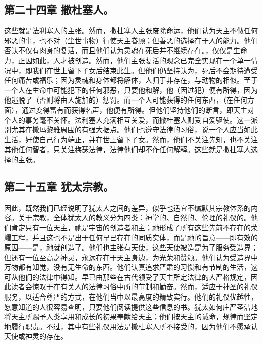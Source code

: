 
\subsection{第二十四章 撒杜塞人。}

这些就是法利塞人的主张。然而，撒杜塞人主张废除命运，他们认为天主不做任何邪恶的事，也不对（尘世事物）行使天主眷顾；但善恶的选择在于人的能力。他们否认不仅有肉身的复活，而且他们认为灵魂在死后并不继续存在。，仅仅是生命力，正因如此，人才被创造。然而，他们主张复活的观念已完全实现在一个单一情况中，即我们在世上留下子女后结束此生。但他们仍坚持认为，死后不会期待遭受任何痛苦或福乐；因为灵魂和身体都将解体，人归于非存在，与动物的相似。至于一个人在生命中可能犯下的任何邪恶，只要他和解，他（因过犯）便有所得，因为他逃脱了（否则将由人施加的）惩罚。而一个人可能获得的任何东西，（在任何方面），通过变得富有而获得名声，他便有所得。但他们坚持他们的断言，即天主对个人的事务毫不关怀。法利塞人充满相互关爱，而撒杜塞人则受自爱驱使。这一派别尤其在撒玛黎雅周围的有强大据点。他们也遵守法律的习俗，说一个人应当如此生活，好使自己行为端正，并在世上留下子女。然而，他们不关注先知，也不关注其他任何智者，只关注梅瑟法律，法律他们却不作任何解释。这些就是撒杜塞人选择的主张。\par


\subsection{第二十五章 犹太宗教。}

因此，既然我们已经说明了犹太人之间的差异，似乎也适宜不缄默其宗教体系的内容。关于宗教，全体犹太人的教义分为四类：神学的、自然的、伦理的礼仪的。他们肯定只有一位天主，祂是宇宙的创造者和主；祂形成了所有这些先前不存在的荣耀工程，并且这也不是出于任何早已存在的同质实体，而是祂的旨意——即有效的原因——是，祂就创造了。他们也主张有天使，这些天使被造是为了服务受造界；但还有一位至高之神灵，永远存在于天主身边，为光荣和赞颂。他们认为受造界中万物都有知觉，没有无生命的东西。他们认真追求严肃的习惯和有节制的生活，这可从他们的法律中得知。早已由那些在古代领受了天主所定法律的人严格规定，因此读者会惊叹于在有关人的法律习俗中所的节制和勤奋。然而，适应于神圣的礼仪服务，以适合尊严的方式，在他们当中以最高度的精致实行。他们的礼仪优越性，愿意知道的人很容易查明，只要他们阅读提供这些信息的书。犹太如何庄严圣洁地将天主所赐予人类享用和成长的初果奉献给天主；他们按天主的诫命，规律而坚定地履行职责。不过，其中有些礼仪用法是撒杜塞人所不接受的，因为他们不愿承认天使或神灵的存在。\par

